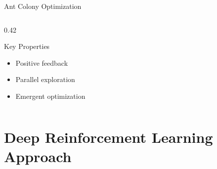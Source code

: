 \documentclass[aspectratio=169,11pt]{beamer}
\begin{document}
\begin{frame}{Ant Colony Optimization}
\begin{columns}[T]
\begin{column}{0.42\textwidth}
            \begin{block}{Key Properties}
                \begin{itemize}
                    \item Positive feedback
                    \item Parallel exploration
                    \item Emergent optimization
                \end{itemize}
            \end{block}
        \end{column}
    \end{columns}
\end{frame}

\section{Deep Reinforcement Learning Approach}
\end{document}
